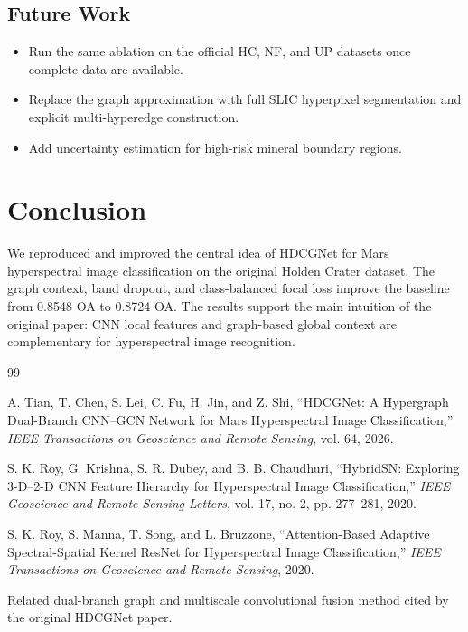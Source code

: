 \documentclass[conference]{IEEEtran}
\begin{document}
\subsection{Future Work}
\begin{itemize}
    \item Run the same ablation on the official HC, NF, and UP datasets once complete data are available.
    \item Replace the graph approximation with full SLIC hyperpixel segmentation and explicit multi-hyperedge construction.
    \item Add uncertainty estimation for high-risk mineral boundary regions.
\end{itemize}

\section{Conclusion}
We reproduced and improved the central idea of HDCGNet for Mars hyperspectral image classification on the original Holden Crater dataset. The graph context, band dropout, and class-balanced focal loss improve the baseline from 0.8548 OA to 0.8724 OA. The results support the main intuition of the original paper: CNN local features and graph-based global context are complementary for hyperspectral image recognition.

\begin{thebibliography}{99}

A. Tian, T. Chen, S. Lei, C. Fu, H. Jin, and Z. Shi,
``HDCGNet: A Hypergraph Dual-Branch CNN--GCN Network for Mars Hyperspectral Image Classification,''
\textit{IEEE Transactions on Geoscience and Remote Sensing}, vol. 64, 2026.

S. K. Roy, G. Krishna, S. R. Dubey, and B. B. Chaudhuri,
``HybridSN: Exploring 3-D--2-D CNN Feature Hierarchy for Hyperspectral Image Classification,''
\textit{IEEE Geoscience and Remote Sensing Letters}, vol. 17, no. 2, pp. 277--281, 2020.

S. K. Roy, S. Manna, T. Song, and L. Bruzzone,
``Attention-Based Adaptive Spectral-Spatial Kernel ResNet for Hyperspectral Image Classification,''
\textit{IEEE Transactions on Geoscience and Remote Sensing}, 2020.

Related dual-branch graph and multiscale convolutional fusion method cited by the original HDCGNet paper.

\end{thebibliography}
\end{document}
